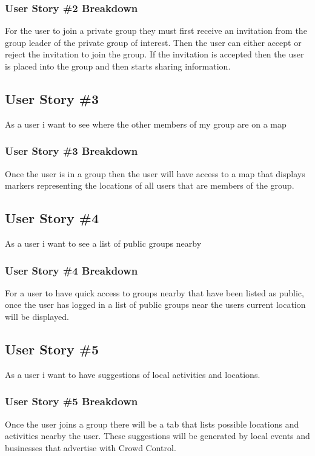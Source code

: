 \subsubsection{User Story \#2 Breakdown}
For the user to join a private group they must first receive an invitation from the group leader of the private group of interest.  Then the user can either accept or reject the invitation to join the group.  If the invitation is accepted then the user is placed into the group and then starts sharing information. 

\subsection{User Story \#3} 
As a user i want to see where the other members of my group are on a map

\subsubsection{User Story \#3 Breakdown}
Once the user is in a group then the user will have access to a map that displays markers representing the locations of all users that are members of the group.

\subsection{User Story \#4} 
As a user i want to see a list of public groups nearby

\subsubsection{User Story \#4 Breakdown}
For a user to have quick access to groups nearby that have been listed as public, once the user has logged in a list of public groups near the users current location will be displayed.

\subsection{User Story \#5} 
As a user i want to have suggestions of local activities and locations.

\subsubsection{User Story \#5 Breakdown}
Once the user joins a group there will be a tab that lists possible locations and activities nearby the user.  These suggestions will be generated by local events and businesses that advertise with Crowd Control.

